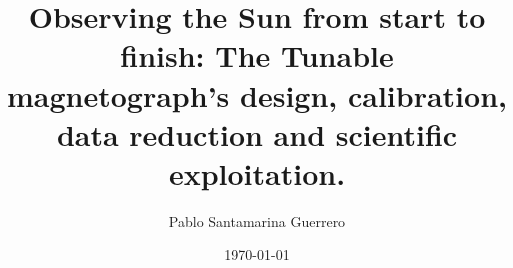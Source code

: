 \documentclass[12pt]{mythesis}
\title{Observing the Sun from start to finish: The Tunable magnetograph's design, calibration, data reduction and scientific exploitation.}
\author{Pablo Santamarina Guerrero}
\date{\today}
\begin{document}
\frontmatter %
\maketitle
\cleardoublepage







\tableofcontents

\mainmatter %
%





%

%





\cleardoublepage
\layout
\end{document}
